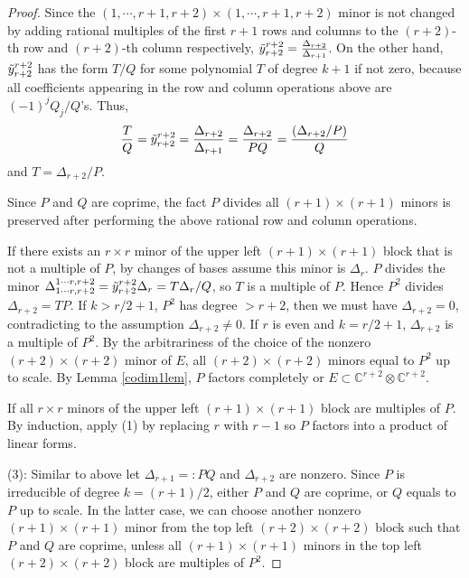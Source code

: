\documentclass[10pt]{article} %
\theoremstyle{definition}
\begin{document}
\begin{proof}
Since the $(1,\cdots,r+1,r+2)\times(1,\cdots,r+1,r+2)$ minor is not changed by adding rational multiples of the first $r+1$ rows and columns to the $(r+2)$-th row and $(r+2)$-th column respectively, $\Tilde{y}^{r+2}_{r+2}=\frac{\Delta_{r+2}}{\Delta_{r+1}}$. On the other hand, $\Tilde{y}^{r+2}_{r+2}$ has the form $T/Q$ for some polynomial $T$ of degree $k+1$ if not zero, because all coefficients appearing in the row and column operations above are $(-1)^{j}Q_j/Q$'s. Thus,
\begin{equation}\label{ytilde}
    \frac{T}{Q}=\Tilde{y}^{r+2}_{r+2}=\frac{\Delta_{r+2}}{\Delta_{r+1}}=\frac{\Delta_{r+2}}{PQ}=\frac{(\Delta_{r+2}/P)}{Q}
\end{equation}
and $T=\Delta_{r+2}/P$.

Since $P$ and $Q$ are coprime, the fact $P$ divides all $(r+1)\times(r+1)$ minors is preserved after performing the above rational row and column operations. 

If there exists an $r\times r$ minor of the upper left $(r+1)\times(r+1)$ block that is not a multiple of $P$, by changes of bases assume this minor is $\Delta_r$. $P$ divides the minor $\Delta^{1\cdots r,r+2}_{1\cdots r,r+2}=\Tilde{y}^{r+2}_{r+2}\Delta_r=T\Delta_r/Q$, so $T$ is a multiple of $P$. Hence $P^2$ divides $\Delta_{r+2}=TP$. If $k>r/2+1$, $P^2$ has degree $>r+2$, then we must have $\Delta_{r+2}=0$, contradicting to the assumption $\Delta_{r+2}\neq 0$. If $r$ is even and $k=r/2+1$, $\Delta_{r+2}$ is a multiple of $P^2$. By the arbitrariness of the choice of the nonzero $(r+2)\times(r+2)$ minor of $E$, all $(r+2)\times(r+2)$ minors equal to $P^2$ up to scale. By Lemma \ref{codim1lem}, $P$ factors completely or $E\subset\mathbb{C}^{r+2}\otimes\mathbb{C}^{r+2}$. 

If all $r\times r$ minors of the upper left $(r+1)\times(r+1)$ block are multiples of $P$. By induction, apply (1) by replacing $r$ with $r-1$ so $P$ factors into a product of linear forms.

(3): Similar to above let $\Delta_{r+1}=:PQ$ and $\Delta_{r+2}$ are nonzero. Since $P$ is irreducible of degree $k=(r+1)/2$, either $P$ and $Q$ are coprime, or $Q$ equals to $P$ up to scale. In the latter case, we can choose another nonzero $(r+1)\times (r+1)$ minor from the top left $(r+2)\times(r+2)$ block such that $P$ and $Q$ are coprime, unless all $(r+1)\times (r+1)$ minors in the top left $(r+2)\times(r+2)$ block are multiples of $P^2$.


\end{proof}
\end{document}
